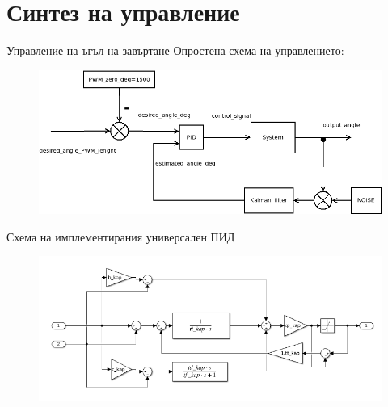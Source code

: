 \documentclass{beamer}
\begin{document}
\section{Синтез на управление}

\begin{frame}{Управление на ъгъл на завъртане}
	\pause
	Опростена схема на управлението: 
	\begin{figure}[htpb!]
		\centering
		\includegraphics[width=1\textwidth]{Images/control_diagram_simple.png}
	\end{figure}
\end{frame}

\begin{frame}{Схема на имплементирания универсален ПИД}
	\pause

	\begin{figure}[htpb!]
		\centering
		\includegraphics[width=1\textwidth]{Images/universal_pid.png}
	\end{figure}

\end{frame}
\end{document}

